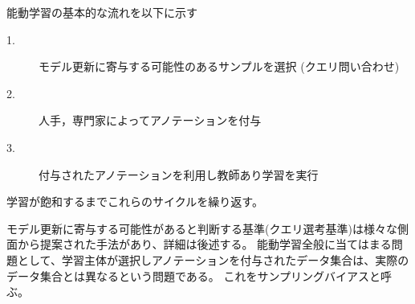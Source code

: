 能動学習の基本的な流れを以下に示す
\begin{description}
    \item[1.] モデル更新に寄与する可能性のあるサンプルを選択 (クエリ問い合わせ)
    \item[2.] 人手，専門家によってアノテーションを付与
    \item[3.] 付与されたアノテーションを利用し教師あり学習を実行
\end{description}
学習が飽和するまでこれらのサイクルを繰り返す。

モデル更新に寄与する可能性があると判断する基準(クエリ選考基準)は様々な側面から提案された手法があり、詳細は後述する。
能動学習全般に当てはまる問題として、学習主体が選択しアノテーションを付与されたデータ集合は、実際のデータ集合とは異なるという問題である。
これをサンプリングバイアスと呼ぶ。

